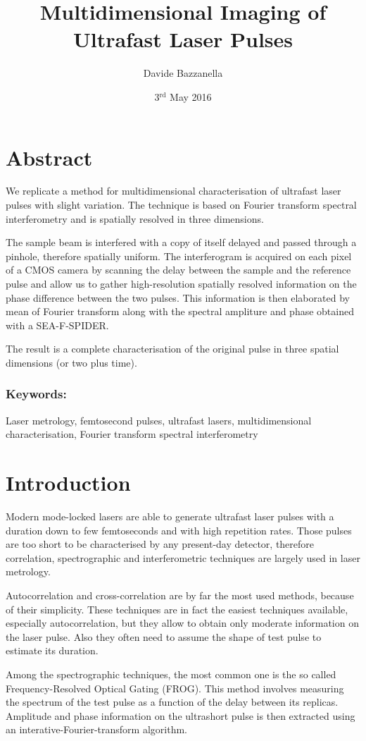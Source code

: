 \documentclass[12pt,a4paper,twoside]{article}
\author{Davide Bazzanella}
\title{Multidimensional Imaging of Ultrafast Laser Pulses}
\date{3$^{\mathrm{rd}}$ May 2016}
\begin{document}

\cleardoublepage
\section*{Abstract}
We replicate a method for multidimensional characterisation of ultrafast laser pulses with slight variation.
The technique is based on Fourier transform spectral interferometry and is spatially resolved in three dimensions.

The sample beam is interfered with a copy of itself delayed and passed through a pinhole, therefore spatially uniform.
The interferogram is acquired on each pixel of a CMOS camera by scanning the delay between the sample and the reference pulse and allow us to gather high-resolution spatially resolved information on the phase difference between the two pulses.
This information is then elaborated by mean of Fourier transform along with the spectral ampliture and phase obtained with a SEA-F-SPIDER.

The result is a complete characterisation of the original pulse in three spatial dimensions (or two plus time).
\subsubsection*{Keywords:} Laser metrology, femtosecond pulses, ultrafast lasers, multidimensional characterisation, Fourier transform spectral interferometry
\cleardoublepage
\tableofcontents

\cleardoublepage
{}
\section{Introduction}
Modern mode-locked lasers are able to generate ultrafast laser pulses with a duration down to few femtoseconds \cite{tamura93,schriever14,yu30} and with high repetition rates.
Those pulses are too short to be characterised by any present-day detector, therefore correlation, spectrographic and interferometric techniques are largely used in laser metrology.

Autocorrelation and cross-correlation are by far the most used methods, because of their simplicity.
These techniques are in fact the easiest techniques available, especially autocorrelation, but they allow to obtain only moderate information on the laser pulse.
Also they often need to assume the shape of test pulse to estimate its duration.

Among the spectrographic techniques, the most common one is the so called Frequency-Resolved Optical Gating (FROG).
This method involves measuring the spectrum of the test pulse as a function of the delay between its replicas.
Amplitude and phase information on the ultrashort pulse is then extracted using an interative-Fourier-transform algorithm.
\end{document}
